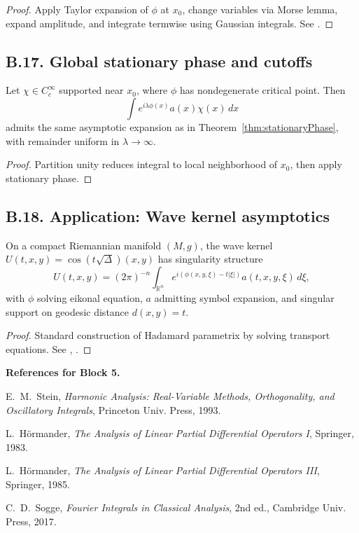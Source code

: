 \begin{proof}
Apply Taylor expansion of $\phi$ at $x_0$, change variables via Morse lemma, expand amplitude, and integrate termwise using Gaussian integrals. See \cite[Chap.~VII]{HörmanderI}.
\end{proof}

\subsection*{B.17. Global stationary phase and cutoffs}
\label{appB:globalSP}

\begin{proposition}
\label{prop:SPcutoff}
Let $\chi\in C_c^\infty$ supported near $x_0$, where $\phi$ has nondegenerate critical point. Then
\[
\int e^{i\lambda\phi(x)} a(x)\chi(x)\, dx
\]
admits the same asymptotic expansion as in Theorem~\ref{thm:stationaryPhase}, with remainder uniform in $\lambda\to\infty$.
\end{proposition}

\begin{proof}
Partition unity reduces integral to local neighborhood of $x_0$, then apply stationary phase.
\end{proof}

\subsection*{B.18. Application: Wave kernel asymptotics}
\label{appB:wavekernel}

\begin{theorem}
\label{thm:hadamard}
On a compact Riemannian manifold $(M,g)$, the wave kernel $U(t,x,y)=\cos(t\sqrt{\Delta})(x,y)$ has singularity structure
\[
U(t,x,y) = (2\pi)^{-n}\int_{\mathbb{R}^n} e^{i(\phi(x,y,\xi)-t|\xi|)} a(t,x,y,\xi)\, d\xi,
\]
with $\phi$ solving eikonal equation, $a$ admitting symbol expansion, and singular support on geodesic distance $d(x,y)=t$.
\end{theorem}

\begin{proof}
Standard construction of Hadamard parametrix by solving transport equations. See \cite[Chap.~17]{HormanderIII}, \cite{Sogge}.
\end{proof}

\medskip

\noindent\textbf{References for Block 5.}
\begin{thebibliography}{99}

E.~M.~Stein, \emph{Harmonic Analysis: Real-Variable Methods, Orthogonality, and Oscillatory Integrals}, Princeton Univ. Press, 1993.

L.~Hörmander, \emph{The Analysis of Linear Partial Differential Operators I}, Springer, 1983.

L.~Hörmander, \emph{The Analysis of Linear Partial Differential Operators III}, Springer, 1985.

C.~D.~Sogge, \emph{Fourier Integrals in Classical Analysis}, 2nd ed., Cambridge Univ. Press, 2017.

\end{thebibliography}

